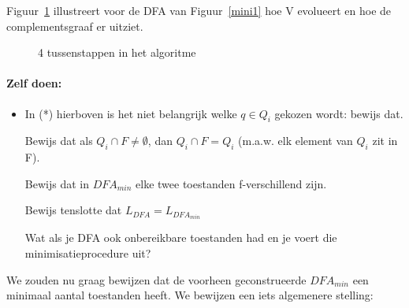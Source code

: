 Figuur~\ref{minim1} illustreert voor de DFA van Figuur~\ref{mini1} hoe
V evolueert en hoe de complementsgraaf er uitziet.
\begin{figure}[h]
\caption{ 4 tussenstappen in het algoritme\label{minim1}}
\end{figure}
\paragraph{Zelf doen:}
\begin{itemize}
\item[]
In (*) hierboven is het niet belangrijk welke $q \in Q_i$
gekozen wordt: bewijs dat.

Bewijs dat als $Q_i \cap F \neq \emptyset$, dan $Q_i \cap F = Q_i$
(m.a.w. elk element van $Q_i$ zit in F).

Bewijs dat in $DFA_{min}$ elke twee toestanden f-verschillend zijn.

Bewijs tenslotte dat $L_{DFA} = L_{DFA_{min}}$

Wat als je DFA ook onbereikbare toestanden had en je voert die
minimisatieprocedure uit?
\end{itemize}


\newpage
We zouden nu graag bewijzen dat de voorheen geconstrueerde $DFA_{min}$
een minimaal aantal toestanden heeft. We bewijzen een iets algemenere
stelling:

